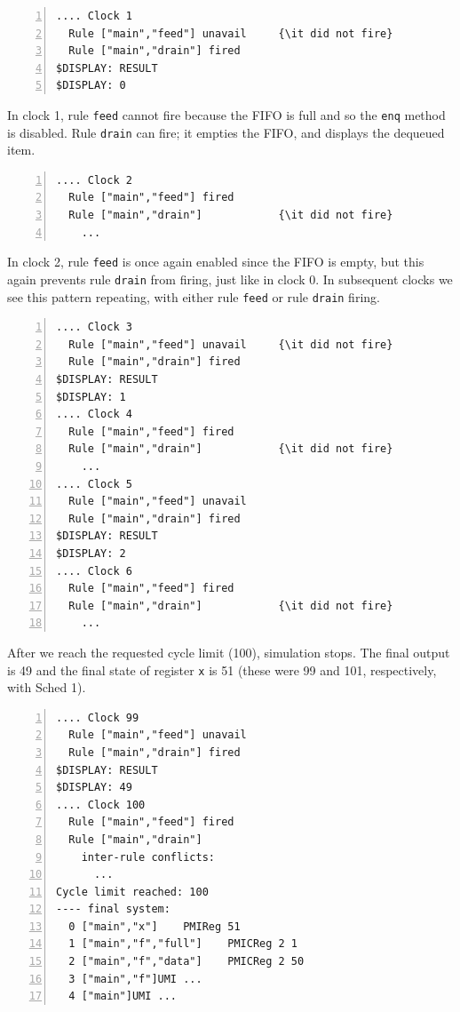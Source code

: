 \documentclass[11pt]{article}
\newcommand{\term}[1]{\texttt{#1}}
\begin{document}
\begin{Verbatim}[frame=single, numbers=left, commandchars=\\\{\}]
.... Clock 1
  Rule ["main","feed"] unavail     {\it did not fire}
  Rule ["main","drain"] fired
$DISPLAY: RESULT
$DISPLAY: 0
\end{Verbatim}

In clock 1, rule \term{feed} cannot fire because the FIFO is full and
so the \term{enq} method is disabled. Rule \term{drain} can fire; it empties the FIFO, and
displays the dequeued item.

\begin{Verbatim}[frame=single, numbers=left, commandchars=\\\{\}]
.... Clock 2
  Rule ["main","feed"] fired
  Rule ["main","drain"]            {\it did not fire}
    ...
\end{Verbatim}

In clock 2, rule \term{feed} is once again enabled since the FIFO is
empty, but this again prevents rule \term{drain} from firing, just
like in clock 0.  In subsequent clocks we see this pattern repeating,
with either rule \term{feed} or rule \term{drain} firing.

\begin{Verbatim}[frame=single, numbers=left, commandchars=\\\{\}]
.... Clock 3
  Rule ["main","feed"] unavail     {\it did not fire}
  Rule ["main","drain"] fired
$DISPLAY: RESULT
$DISPLAY: 1
.... Clock 4
  Rule ["main","feed"] fired
  Rule ["main","drain"]            {\it did not fire}
    ...
.... Clock 5
  Rule ["main","feed"] unavail
  Rule ["main","drain"] fired
$DISPLAY: RESULT
$DISPLAY: 2
.... Clock 6
  Rule ["main","feed"] fired
  Rule ["main","drain"]            {\it did not fire}
    ...
\end{Verbatim}

After we reach the requested cycle limit (100), simulation stops.  The
final output is 49 and the final state of register \term{x} is 51
(these were 99 and 101, respectively, with Sched 1).

\begin{Verbatim}[frame=single, numbers=left, commandchars=\\\{\}]
.... Clock 99
  Rule ["main","feed"] unavail
  Rule ["main","drain"] fired
$DISPLAY: RESULT
$DISPLAY: 49
.... Clock 100
  Rule ["main","feed"] fired
  Rule ["main","drain"]
    inter-rule conflicts:
      ...
Cycle limit reached: 100
---- final system: 
  0 ["main","x"]    PMIReg 51
  1 ["main","f","full"]    PMICReg 2 1
  2 ["main","f","data"]    PMICReg 2 50
  3 ["main","f"]UMI ...
  4 ["main"]UMI ...
\end{Verbatim}
\end{document}

